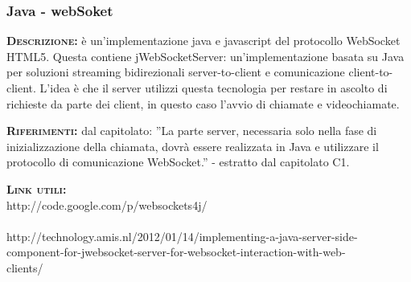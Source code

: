 \subsubsection{Java - webSoket}
\begin{description}
	\item{\scshape\bfseries Descrizione:} è un'implementazione java e javascript del protocollo WebSocket HTML5. Questa contiene jWebSocketServer: un'implementazione basata su Java per soluzioni streaming bidirezionali server-to-client e comunicazione client-to-client. L'idea è che il server utilizzi questa tecnologia per restare in ascolto di richieste da parte dei client, in questo caso l'avvio di chiamate e videochiamate.

	\item{\scshape\bfseries Riferimenti:} dal capitolato: ''La parte server, necessaria solo nella fase di inizializzazione della chiamata, dovrà essere realizzata in Java e utilizzare il protocollo di comunicazione WebSocket.'' - estratto dal capitolato C1.

	\item{\scshape\bfseries Link utili:} \\http://code.google.com/p/websockets4j/
\\\\http://technology.amis.nl/2012/01/14/implementing-a-java-server-side-\\component-for-jwebsocket-server-for-websocket-interaction-with-web-\\clients/
			  
\end{description}

